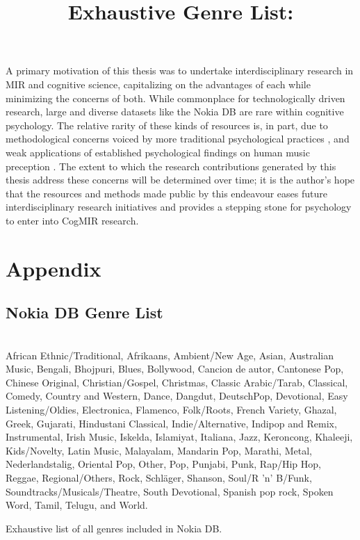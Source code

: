 \documentclass[a4paper]{article}
\begin{document}
A primary motivation of this thesis was to undertake interdisciplinary research in MIR and cognitive science, capitalizing on the advantages of each while minimizing the concerns of both. While commonplace for technologically driven research, large and diverse datasets like the Nokia DB are rare within cognitive psychology. The relative rarity of these kinds of resources is, in part, due to methodological concerns voiced by more traditional psychological practices \cite{aucouturier2013seven}, and weak applications of established psychological findings on human music preception \cite{krumhansl1997exploratory,aucouturier2012mel}. The extent to which the research contributions generated by this thesis address these concerns will be determined over time; it is the author's hope that the resources and methods made public by this endeavour eases future interdisciplinary research initiatives and provides a stepping stone for psychology to enter into CogMIR research.

\newpage




\newpage
\section{Appendix\label{sec:appendix}}
\subsection{Nokia DB Genre List}
\begin{table}[h!]
\title{Exhaustive Genre List:}\\
African Ethnic/Traditional, Afrikaans, Ambient/New Age, Asian, Australian Music, Bengali, Bhojpuri, Blues, Bollywood, Cancion de autor, Cantonese Pop, Chinese Original, Christian/Gospel, Christmas, Classic Arabic/Tarab, Classical, Comedy, Country and Western, Dance, Dangdut, DeutschPop, Devotional, Easy Listening/Oldies, Electronica, Flamenco, Folk/Roots, French Variety, Ghazal, Greek, Gujarati, Hindustani Classical, Indie/Alternative, Indipop and Remix, Instrumental, Irish Music, Iskelda, Islamiyat, Italiana, Jazz, Keroncong, Khaleeji, Kids/Novelty, Latin Music, Malayalam, Mandarin Pop, Marathi, Metal, Nederlandstalig, Oriental Pop, Other, Pop, Punjabi, Punk, Rap/Hip Hop, Reggae, Regional/Others, Rock, Schl{\"a}ger, Shanson, Soul/R 'n' B/Funk, Soundtracks/Musicals/Theatre, South Devotional, Spanish pop rock, Spoken Word, Tamil, Telugu, and World.
\caption[Complete Nokia DB Genre List]{Exhaustive list of all genres included in Nokia DB.}
\end{table}
\end{document}
